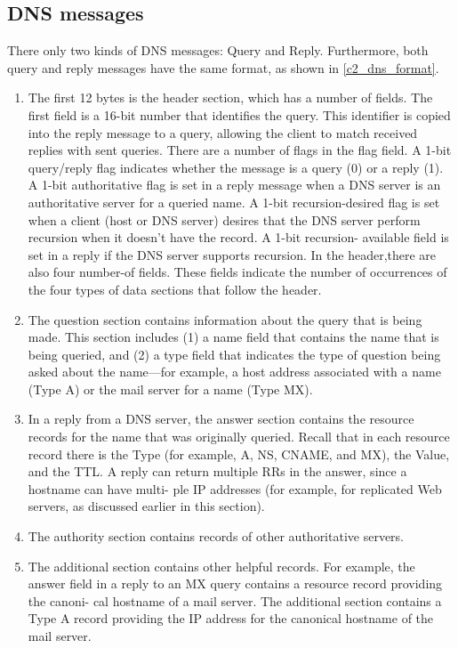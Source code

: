 \subsection{DNS messages}

\hf There only two kinds of DNS messages: Query and Reply. Furthermore, both
query and reply messages have the same format, as shown in \autoref{c2_dns_format}.\\
\begin{enumerate}
    \item The first 12 bytes is the header section, which has a number of fields. The first field
    is a 16-bit number that identifies the query. This identifier is copied into the reply
    message to a query, allowing the client to match received replies with sent queries.
    There are a number of flags in the flag field. A 1-bit query/reply flag indicates
    whether the message is a query (0) or a reply (1). A 1-bit authoritative flag is set in a
    reply message when a DNS server is an authoritative server for a queried name. A
    1-bit recursion-desired flag is set when a client (host or DNS server) desires that the
    DNS server perform recursion when it doesn’t have the record. A 1-bit recursion-
    available field is set in a reply if the DNS server supports recursion. In the header,there are also four number-of fields. These fields indicate the number of occurrences
    of the four types of data sections that follow the header.
    \item The question section contains information about the query that is being made.
    This section includes (1) a name field that contains the name that is being
    queried, and (2) a type field that indicates the type of question being asked about
    the name—for example, a host address associated with a name (Type A) or the
    mail server for a name (Type MX).
    \item In a reply from a DNS server, the answer section contains the resource records
    for the name that was originally queried. Recall that in each resource record there
    is the Type (for example, A, NS, CNAME, and MX), the Value, and the TTL.
    A reply can return multiple RRs in the answer, since a hostname can have multi-
    ple IP addresses (for example, for replicated Web servers, as discussed earlier in
    this section).
    \item The authority section contains records of other authoritative servers.
    \item The additional section contains other helpful records. For example, the answer
    field in a reply to an MX query contains a resource record providing the canoni-
    cal hostname of a mail server. The additional section contains a Type A record
    providing the IP address for the canonical hostname of the mail server.
\end{enumerate}


